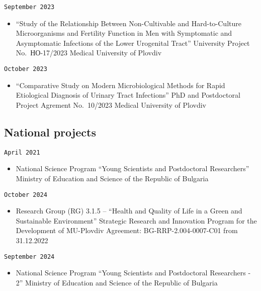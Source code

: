 \documentclass[
  12pt,
  letterpaper,
  DIV=11,
  numbers=noendperiod]{scrartcl}
\providecommand{\tightlist}{%
  \setlength{\itemsep}{0pt}\setlength{\parskip}{0pt}}\usepackage{longtable,booktabs,array}
\begin{document}
\texttt{September\ 2023}

\begin{itemize}
\tightlist
\item
  ``Study of the Relationship Between Non-Cultivable and Hard-to-Culture
  Microorganisms and Fertility Function in Men with Symptomatic and
  Asymptomatic Infections of the Lower Urogenital Tract'' \textbar{}
  University Project No.~НО-17/2023 \textbar{} Medical University of
  Plovdiv
\end{itemize}

\texttt{October\ 2023}

\begin{itemize}
\tightlist
\item
  ``Comparative Study on Modern Microbiological Methods for Rapid
  Etiological Diagnosis of Urinary Tract Infections'' \textbar{} PhD and
  Postdoctoral Project \textbar{} Agrement No.~10/2023 \textbar{}
  Medical University of Plovdiv
\end{itemize}

\subsection{National projects}\label{national-projects}

\texttt{April\ 2021}

\begin{itemize}
\tightlist
\item
  National Science Program ``Young Scientists and Postdoctoral
  Researchers'' \textbar{} Ministry of Education and Science of the
  Republic of Bulgaria
\end{itemize}

\texttt{October\ 2024}

\begin{itemize}
\tightlist
\item
  Research Group (RG) 3.1.5 -- ``Health and Quality of Life in a Green
  and Sustainable Environment'' \textbar{} Strategic Research and
  Innovation Program for the Development of MU-Plovdiv \textbar{}
  Agreement: BG-RRP-2.004-0007-C01 from 31.12.2022
\end{itemize}

\texttt{September\ 2024}

\begin{itemize}
\tightlist
\item
  National Science Program ``Young Scientists and Postdoctoral
  Researchers - 2'' \textbar{} Ministry of Education and Science of the
  Republic of Bulgaria
\end{itemize}
\end{document}
